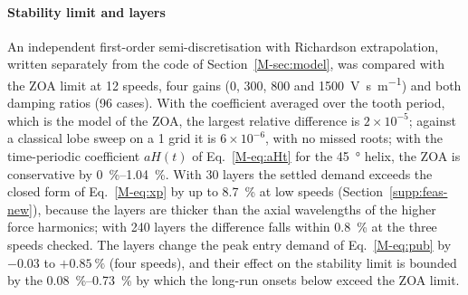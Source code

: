 \paragraph{Stability limit and layers}
An independent first-order semi-discretisation \citep{insperger2002semi,insperger2004updated,insperger2011book} with Richardson extrapolation, written separately from the code of Section~\ref{M-sec:model}, was compared with the ZOA limit at 12 speeds, four gains (0, 300, 800 and \SI{1500}{\volt\second\per\metre}) and both damping ratios (96 cases). With the coefficient averaged over the tooth period, which is the model of the ZOA, the largest relative difference is $2\times10^{-5}$; against a classical lobe sweep on a \SI{1}{\rpm} grid it is $6\times10^{-6}$, with no missed roots; with the time-periodic coefficient $aH(t)$ of Eq.~\eqref{M-eq:aHt} for the \SI{45}{\degree} helix, the ZOA is conservative by \SIrange{0}{1.04}{\percent}. With 30 layers the settled demand exceeds the closed form of Eq.~\eqref{M-eq:xp} by up to \SI{8.7}{\percent} at low speeds (Section~\ref{supp:feas-new}), because the layers are thicker than the axial wavelengths of the higher force harmonics; with 240 layers the difference falls within \SI{0.8}{\percent} at the three speeds checked. The layers change the peak entry demand of Eq.~\eqref{M-eq:pub} by $-0.03$ to $+\SI{0.85}{\percent}$ (four speeds), and their effect on the stability limit is bounded by the \SIrange{0.08}{0.73}{\percent} by which the long-run onsets below exceed the ZOA limit.

